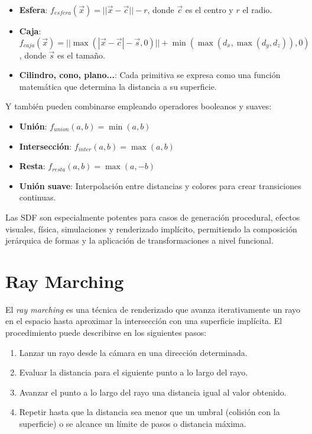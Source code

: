 \begin{itemize}
    \item \textbf{Esfera}: $f_{esfera}(\vec{x}) = ||\vec{x} - \vec{c}|| - r$, donde $\vec{c}$ es el centro y $r$ el radio.
    \item \textbf{Caja}: $f_{caja}(\vec{x}) = ||\max(|\vec{x} - \vec{c}| - \vec{s}, 0)|| + \min(\max(d_x, \max(d_y, d_z)), 0)$, donde $\vec{s}$ es el tamaño.
    \item \textbf{Cilindro, cono, plano...}: Cada primitiva se expresa como una función matemática que determina la distancia a su superficie.
\end{itemize}

Y también pueden combinarse empleando operadores booleanos y suaves:

\begin{itemize}
    \item \textbf{Unión}: $f_{union}(a, b) = \min(a, b)$
    \item \textbf{Intersección}: $f_{inter}(a, b) = \max(a, b)$
    \item \textbf{Resta}: $f_{resta}(a, b) = \max(a, -b)$
    \item \textbf{Unión suave}: Interpolación entre distancias y colores para crear transiciones continuas.
\end{itemize}

Las SDF son especialmente potentes para casos de generación procedural,
efectos visuales, física, simulaciones y renderizado implícito, permitiendo la
composición jerárquica de formas y la aplicación de transformaciones a nivel
funcional.

\section{Ray Marching}

El \textit{ray marching} es una técnica de renderizado que avanza iterativamente un rayo en el espacio hasta aproximar la intersección con
una superficie implícita. El procedimiento puede describirse en los siguientes
pasos:

\begin{enumerate}
    \item Lanzar un rayo desde la cámara en una dirección determinada.
    \item Evaluar la distancia para el siguiente punto a lo largo del rayo.
    \item Avanzar el punto a lo largo del rayo una distancia igual al valor obtenido.
    \item Repetir hasta que la distancia sea menor que un umbral (colisión con la
          superficie) o se alcance un límite de pasos o distancia máxima.
\end{enumerate}

